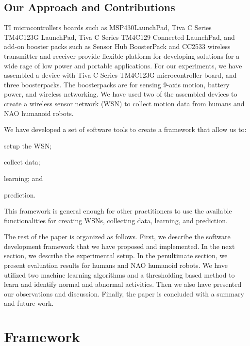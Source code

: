 \documentclass[letterpaper]{article}
\begin{document}
\begin{sloppy}
\subsection{Our Approach and Contributions}

TI microcontrollers  boards such as MSP430{\texttrademark}LaunchPad, Tiva{\texttrademark} C Series 
TM4C123G LaunchPad, Tiva C Series TM4C129 Connected LaunchPad, and add-on booster packs such as 
Sensor Hub BoosterPack and CC2533  wireless transmitter and receiver  provide flexible platform for 
developing solutions for a wide rage of low power and portable applications. For our experiments, 
we have assembled a device with Tiva C Series TM4C123G microcontroller board, and three 
boosterpacks. The boosterpacks are for sensing 9-axis motion, battery power, and wireless 
networking. We have used two of the assembled devices to create a wireless sensor network (WSN) to 
collect motion data from  humans and NAO humanoid robots.   

We have developed a set of software tools to create a framework that allow us to: 
\begin{inparaenum}[1)] \item setup the WSN; \item collect data; \item learning; and \item 
prediction. \end{inparaenum} This framework is general enough for other practitioners to use the
available functionalities for creating WSNs, collecting data, learning, and prediction.

The rest of the paper is organized as follows. First, we describe the software development 
framework that we have proposed and implemented. In the next section, we describe the experimental 
setup. In the penultimate section, we present evaluation results for humans and NAO humanoid 
robots. We have utilized two machine learning algorithms and a thresholding based method to learn 
and identify normal and abnormal activities. Then we also have presented our observations and 
discussion. Finally, the paper is concluded with a summary and future work.  

\section{Framework}


\end{sloppy}
\end{document}
